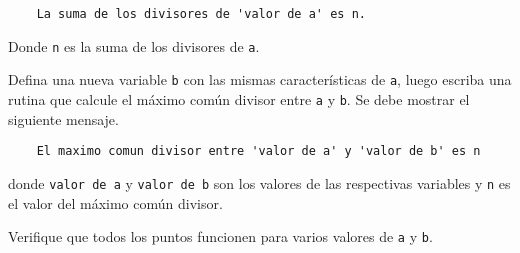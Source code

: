 \documentclass[11pt,letterpaper]{exam}
\begin{document}
\begin{questions}
\begin{verbatim}
	La suma de los divisores de 'valor de a' es n.
\end{verbatim}

Donde \verb'n' es la suma de los divisores de \verb'a'. 
\fi

\question[2.0]

Defina una nueva variable \verb'b' con las mismas caracter\'isticas de \verb'a', luego escriba una rutina que calcule el m\'aximo com\'un divisor entre \verb'a' y \verb'b'. Se debe mostrar el siguiente mensaje.

\begin{verbatim}
	El maximo comun divisor entre 'valor de a' y 'valor de b' es n
\end{verbatim}

donde \verb'valor de a' y \verb'valor de b' son los valores de las respectivas variables y \verb'n' es el valor del m\'aximo com\'un divisor.

\end{questions}

\hspace{-6mm} Verifique que todos los puntos funcionen para varios valores de \verb'a' y \verb'b'.
\end{document}
